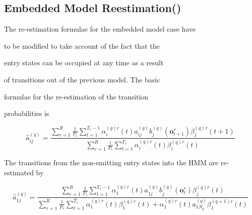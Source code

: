\subsection{Embedded Model Reestimation()}







The re-estimation formulae for the embedded model case have


to be modified to take account of the fact that the


entry states can be occupied at any time as a result


of transitions out of the previous model.  The basic


formulae for the re-estimation of the transition


probabilities is


\newcommand{\albeq}[1]{


                  \sum_{r=1}^R \frac{1}{P_r}


                  \sum_{t=1}^{T_r}


                  \alpha^{(q)r}_#1(t)\beta^{(q)r}_#1(t)


}


\[


   \hat{a}^{(q)}_{ij} = \frac{


                  \sum_{r=1}^R \frac{1}{P_r}


                  \sum_{t=1}^{T_r-1}


      \alpha^{(q)r}_i(t) a^{(q)}_{ij}b^{(q)}_j(\bm{o}^r_{t+1})


         \beta^{(q)r}_j(t+1)


                    }{\albeq{i}}


\]


The transitions from the non-emitting entry states into the HMM are re-estimated by


\[


   \hat{a}^{(q)}_{1j} = \frac{


                  \sum_{r=1}^R \frac{1}{P_r}


                  \sum_{t=1}^{T_r-1}


      \alpha^{(q)r}_1(t) a^{(q)}_{1j}b^{(q)}_j(\bm{o}^r_{t})


         \beta^{(q)r}_j(t)


                    }{\albeq{1} + \alpha^{(q)r}_{1}(t)a^{(q)}_{1N_q}\beta^{(q+1)r}_1(t)}


\]


